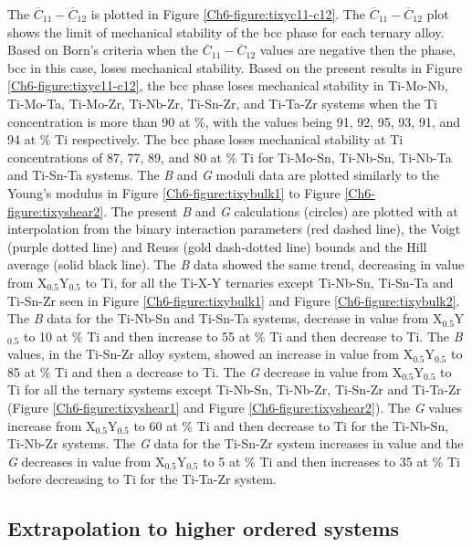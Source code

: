 The $\overline{C}_{11}-\overline{C}_{12}$ is plotted in Figure \ref{Ch6-figure:tixyc11-c12}. The $\overline{C}_{11}-\overline{C}_{12}$ plot shows the limit of mechanical stability of the bcc phase for each ternary alloy. Based on Born’s criteria when the $\overline{C}_{11}-\overline{C}_{12}$ values are negative then the phase, bcc in this case, loses mechanical stability. Based on the present results in Figure \ref{Ch6-figure:tixyc11-c12}, the bcc phase loses mechanical stability in Ti-Mo-Nb, Ti-Mo-Ta, Ti-Mo-Zr, Ti-Nb-Zr, Ti-Sn-Zr, and Ti-Ta-Zr systems when the Ti concentration is more than 90 at \%, with the values being 91, 92, 95, 93, 91, and 94 at \% Ti respectively. The bcc phase loses mechanical stability at Ti concentrations of 87, 77, 89, and 80 at \% Ti for Ti-Mo-Sn, Ti-Nb-Sn, Ti-Nb-Ta and Ti-Sn-Ta systems. The \textit{B} and \textit{G} moduli data are plotted similarly to the Young's modulus in Figure \ref{Ch6-figure:tixybulk1} to Figure \ref{Ch6-figure:tixyshear2}. The present \textit{B} and \textit{G} calculations (circles) are plotted with at interpolation from the binary interaction parameters (red dashed line), the Voigt (purple dotted line) and Reuss (gold dash-dotted line) bounds and the Hill average (solid black line). The \textit{B} data showed the same trend, decreasing in value from X$_{0.5}$Y$_{0.5}$ to Ti, for all the Ti-X-Y ternaries except Ti-Nb-Sn, Ti-Sn-Ta and Ti-Sn-Zr seen in Figure \ref{Ch6-figure:tixybulk1} and Figure \ref{Ch6-figure:tixybulk2}. The \textit{B} data for the Ti-Nb-Sn and Ti-Sn-Ta systems, decrease in value from X$_{0.5}$Y$_{0.5}$ to 10 at \% Ti and then increase to 55 at \% Ti and then decrease to Ti. The \textit{B} values, in the Ti-Sn-Zr alloy system, showed an increase in value from X$_{0.5}$Y$_{0.5}$ to 85 at \% Ti and then a decrease to Ti. The \textit{G} decrease in value from X$_{0.5}$Y$_{0.5}$ to Ti for all the ternary systems except Ti-Nb-Sn, Ti-Nb-Zr, Ti-Sn-Zr and Ti-Ta-Zr (Figure \ref{Ch6-figure:tixyshear1} and Figure \ref{Ch6-figure:tixyshear2}). The \textit{G} values increase from X$_{0.5}$Y$_{0.5}$ to 60 at \% Ti and then decrease to Ti for the Ti-Nb-Sn, Ti-Nb-Zr systems. The \textit{G} data for the Ti-Sn-Zr system increases in value and the \textit{G} decreases in value from X$_{0.5}$Y$_{0.5}$ to 5 at \% Ti and then increases to 35 at \% Ti before decreasing to Ti for the Ti-Ta-Zr system.

\subsection{Extrapolation to higher ordered systems}

